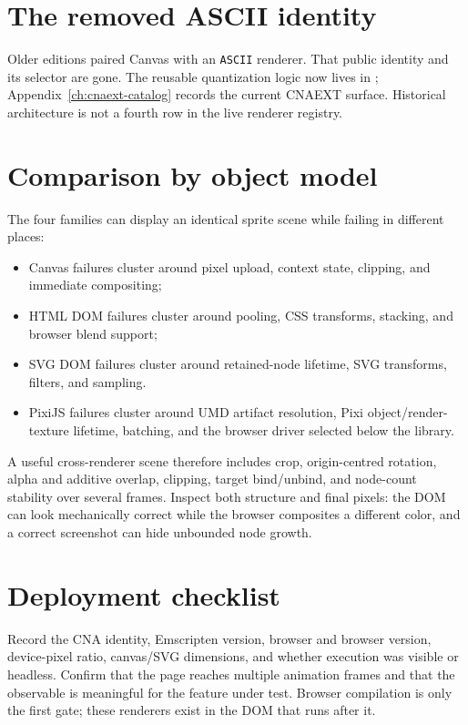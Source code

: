 \section{The removed ASCII identity}

Older editions paired Canvas with an \texttt{ASCII} renderer.  That public identity and its
selector are gone.  The reusable quantization logic now lives in
; Appendix~\ref{ch:cnaext-catalog} records the
current CNAEXT surface.  Historical architecture is not a fourth row in the live renderer
registry.

\section{Comparison by object model}

The four families can display an identical sprite scene while failing in different places:

\begin{itemize}
  \item Canvas failures cluster around pixel upload, context state, clipping, and immediate
        compositing;
  \item HTML DOM failures cluster around pooling, CSS transforms, stacking, and browser blend
        support;
  \item SVG DOM failures cluster around retained-node lifetime, SVG transforms, filters, and
        sampling.
  \item PixiJS failures cluster around UMD artifact resolution, Pixi object/render-texture
        lifetime, batching, and the browser driver selected below the library.
\end{itemize}

A useful cross-renderer scene therefore includes crop, origin-centred rotation, alpha and
additive overlap, clipping, target bind/unbind, and node-count stability over several frames.
Inspect both structure and final pixels: the DOM can look mechanically correct while the
browser composites a different color, and a correct screenshot can hide unbounded node growth.

\section{Deployment checklist}

Record the CNA identity, Emscripten version, browser and browser version, device-pixel ratio,
canvas/SVG dimensions, and whether execution was visible or headless.  Confirm that the page
reaches multiple animation frames and that the observable is meaningful for the feature under
test.  Browser compilation is only the first gate; these renderers exist in the DOM that runs
after it.
